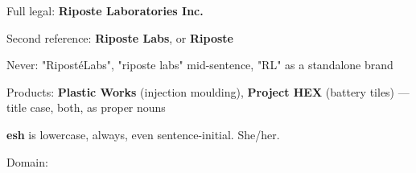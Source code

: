\documentclass[fontpath=fonts/,logopath=logo/]{riposte-doc}
\begin{document}

\begin{ripbullets}
\item Full legal: \textbf{Riposte Laboratories Inc.}
\item Second reference: \textbf{Riposte Labs}, or \textbf{Riposte}
\item Never: "RipostéLabs", "riposte labs" mid-sentence, "RL" as a standalone brand
\item Products: \textbf{Plastic Works} (injection moulding), \textbf{Project HEX} (battery tiles) — title case, both, as proper nouns
\item \textbf{esh} is lowercase, always, even sentence-initial. She/her.
\item Domain: 
\end{ripbullets}

\ripend
\end{document}
